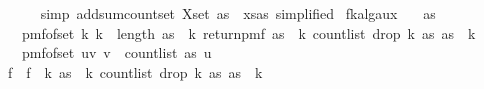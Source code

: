 \begin{isabellebody}
\ \ \ \ \isamarkupfalse%
\ {\isacharparenleft}{\kern0pt}simp\ add{\isacharcolon}{\kern0pt}sum{\isacharunderscore}{\kern0pt}count{\isacharunderscore}{\kern0pt}set{\isacharbrackleft}{\kern0pt}\ X{\isacharequal}{\kern0pt}{\isachardoublequoteopen}set\ as{\isachardoublequoteclose}\ \ xs{\isacharequal}{\kern0pt}{\isachardoublequoteopen}as{\isachardoublequoteclose}{\isacharcomma}{\kern0pt}\ simplified{\isacharbrackright}{\kern0pt}{\isacharparenright}{\kern0pt}\isanewline
{}\isamarkupfalse%
%
\endisatagproof
{\isafoldproof}%
%
\isadelimproof
\isanewline
%
\endisadelimproof
\isanewline
{}\isamarkupfalse%
\ fk{\isacharunderscore}{\kern0pt}alg{\isacharunderscore}{\kern0pt}aux{\isacharunderscore}{\kern0pt}{}{\isacharcolon}{\kern0pt}\isanewline
\ \ \ {\isachardoublequoteopen}as\ {\isasymnoteq}\ {\isacharbrackleft}{\kern0pt}{\isacharbrackright}{\kern0pt}{\isachardoublequoteclose}\isanewline
\ \ \ {\isachardoublequoteopen}pmf{\isacharunderscore}{\kern0pt}of{\isacharunderscore}{\kern0pt}set\ {\isacharbraceleft}{\kern0pt}k{\isachardot}{\kern0pt}\ k\ {\isacharless}{\kern0pt}\ length\ as{\isacharbraceright}{\kern0pt}\ {\isasymbind}\ {\isacharparenleft}{\kern0pt}{\isasymlambda}k{\isachardot}{\kern0pt}\ return{\isacharunderscore}{\kern0pt}pmf\ {\isacharparenleft}{\kern0pt}as\ {\isacharbang}{\kern0pt}\ k{\isacharcomma}{\kern0pt}\ count{\isacharunderscore}{\kern0pt}list\ {\isacharparenleft}{\kern0pt}drop\ {\isacharparenleft}{\kern0pt}k{\isacharplus}{\kern0pt}{}{\isacharparenright}{\kern0pt}\ as{\isacharparenright}{\kern0pt}\ {\isacharparenleft}{\kern0pt}as\ {\isacharbang}{\kern0pt}\ k{\isacharparenright}{\kern0pt}{\isacharparenright}{\kern0pt}{\isacharparenright}{\kern0pt}\isanewline
\ \ {\isacharequal}{\kern0pt}\ pmf{\isacharunderscore}{\kern0pt}of{\isacharunderscore}{\kern0pt}set\ {\isacharbraceleft}{\kern0pt}{\isacharparenleft}{\kern0pt}u{\isacharcomma}{\kern0pt}v{\isacharparenright}{\kern0pt}{\isachardot}{\kern0pt}\ v\ {\isacharless}{\kern0pt}\ count{\isacharunderscore}{\kern0pt}list\ as\ u{\isacharbraceright}{\kern0pt}{\isachardoublequoteclose}\isanewline
%
\isadelimproof
%
\endisadelimproof
%
\isatagproof
{}\isamarkupfalse%
\ {\isacharminus}{\kern0pt}\isanewline
\ \ \isamarkupfalse%
\ f\ \ {\isachardoublequoteopen}f\ {\isacharequal}{\kern0pt}\ {\isacharparenleft}{\kern0pt}{\isasymlambda}k{\isachardot}{\kern0pt}\ {\isacharparenleft}{\kern0pt}as\ {\isacharbang}{\kern0pt}\ k{\isacharcomma}{\kern0pt}\ count{\isacharunderscore}{\kern0pt}list\ {\isacharparenleft}{\kern0pt}drop\ {\isacharparenleft}{\kern0pt}k{\isacharplus}{\kern0pt}{}{\isacharparenright}{\kern0pt}\ as{\isacharparenright}{\kern0pt}\ {\isacharparenleft}{\kern0pt}as\ {\isacharbang}{\kern0pt}\ k{\isacharparenright}{\kern0pt}{\isacharparenright}{\kern0pt}{\isacharparenright}{\kern0pt}{\isachardoublequoteclose}\isanewline

\end{isabellebody}
